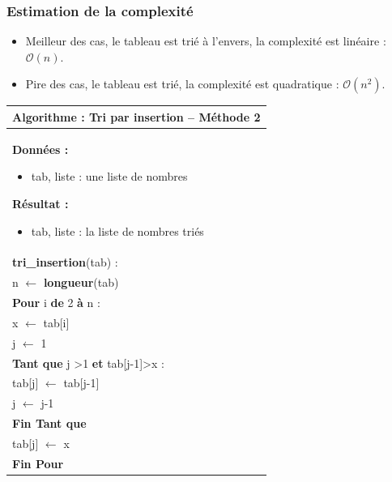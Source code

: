\documentclass[10pt]{article}
\begin{document}
\subsubsection*{Estimation de la complexité}
\begin{itemize}
\item Meilleur des cas, le tableau est trié à l'envers, la complexité est linéaire : $\mathcal{O}(n)$.
\item Pire des cas, le tableau est trié, la complexité est quadratique : $\mathcal{O}(n^2)$.
\end{itemize}


\begin{pseudo}
\begin{center}
\begin{tabular}{p{}}
\hline
\textbf{Algorithme :} Tri par insertion -- Méthode 2\\
\hline
\textbf{Données :}
\begin{itemize}
\item \textsf{tab}, liste : une liste de nombres
\end{itemize}
\textbf{Résultat :} 
\begin{itemize}
\item \textsf{tab}, liste : la liste de nombres triés
\end{itemize}
\\
\textbf{tri\_insertion}(\textsf{tab}) :\\
\hspace{.4cm} \textsf{n} $\leftarrow$ \textbf{longueur}(\textsf{tab}) \\
\hspace{.4cm}\textbf{Pour} \textsf{i} \textbf{de} 2 \textbf{à} \textsf{n} : \\
\hspace{.8cm} \textsf{x} $\leftarrow$ \textsf{tab[i]} \\
\hspace{.8cm} \textsf{j} $\leftarrow$ \textsf{1} \\
\hspace{.8cm}\textbf{Tant que} \textsf{j >1} \textbf{et} \textsf{tab[j-1]>x}  : \\
\hspace{1.2cm} \textsf{tab[j]} $\leftarrow$ \textsf{tab[j-1]} \\
\hspace{1.2cm} \textsf{j} $\leftarrow$ \textsf{j-1} \\
\hspace{.8cm}\textbf{Fin Tant que} \\
\hspace{.8cm} \textsf{tab[j]} $\leftarrow$ \textsf{x} \\
\hspace{.4cm}\textbf{Fin Pour} \\
\hline
\end{tabular}
\end{center}
\end{pseudo}
\end{document}
